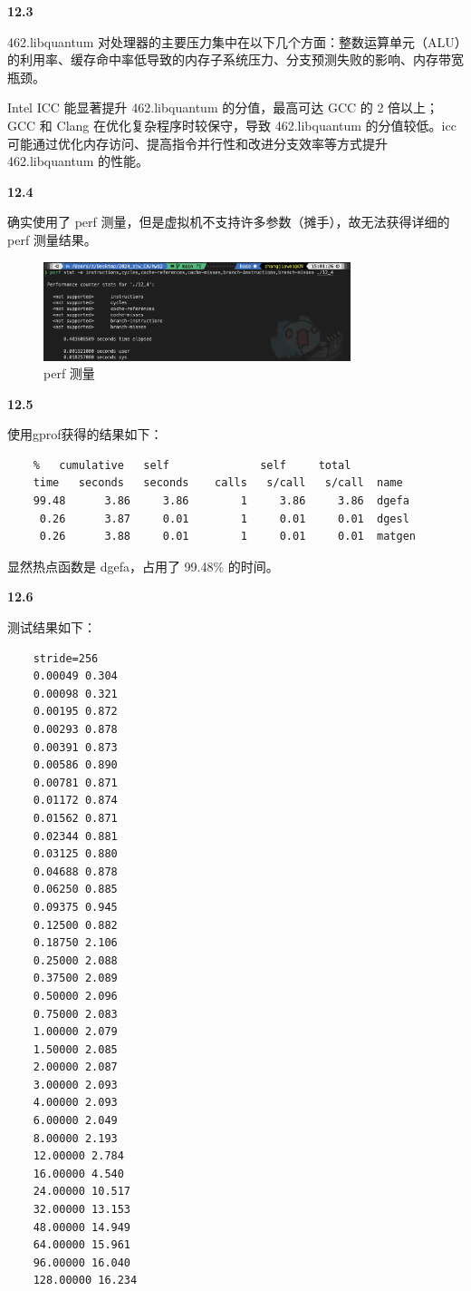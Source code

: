 \documentclass[UTF8]{report}
\begin{document}
\noindent
\textbf{12.3}

462.libquantum 对处理器的主要压力集中在以下几个方面：整数运算单元（ALU）的利用率、缓存命中率低导致的内存子系统压力、分支预测失败的影响、内存带宽瓶颈。

Intel ICC 能显著提升 462.libquantum 的分值，最高可达 GCC 的 2 倍以上；GCC 和 Clang 在优化复杂程序时较保守，导致 462.libquantum 的分值较低。icc 可能通过优化内存访问、提高指令并行性和改进分支效率等方式提升 462.libquantum 的性能。

\noindent
\textbf{12.4}

确实使用了 perf 测量，但是虚拟机不支持许多参数（摊手），故无法获得详细的 perf 测量结果。

\begin{figure}[H]
    \centering
    \includegraphics[width=0.8\textwidth]{img/perf.png}
    \caption{perf 测量}
\end{figure}

\noindent
\textbf{12.5}

使用gprof获得的结果如下：

\begin{lstlisting}
    %   cumulative   self              self     total           
    time   seconds   seconds    calls   s/call   s/call  name    
    99.48      3.86     3.86        1     3.86     3.86  dgefa
     0.26      3.87     0.01        1     0.01     0.01  dgesl
     0.26      3.88     0.01        1     0.01     0.01  matgen   
\end{lstlisting}

显然热点函数是 dgefa，占用了 99.48\% 的时间。

\noindent
\textbf{12.6}

测试结果如下：

\begin{lstlisting}
    stride=256
    0.00049 0.304
    0.00098 0.321
    0.00195 0.872
    0.00293 0.878
    0.00391 0.873
    0.00586 0.890
    0.00781 0.871
    0.01172 0.874
    0.01562 0.871
    0.02344 0.881
    0.03125 0.880
    0.04688 0.878
    0.06250 0.885
    0.09375 0.945
    0.12500 0.882
    0.18750 2.106
    0.25000 2.088
    0.37500 2.089
    0.50000 2.096
    0.75000 2.083
    1.00000 2.079
    1.50000 2.085
    2.00000 2.087
    3.00000 2.093
    4.00000 2.093
    6.00000 2.049
    8.00000 2.193
    12.00000 2.784
    16.00000 4.540
    24.00000 10.517
    32.00000 13.153
    48.00000 14.949
    64.00000 15.961
    96.00000 16.040
    128.00000 16.234
\end{lstlisting}
\end{document}
